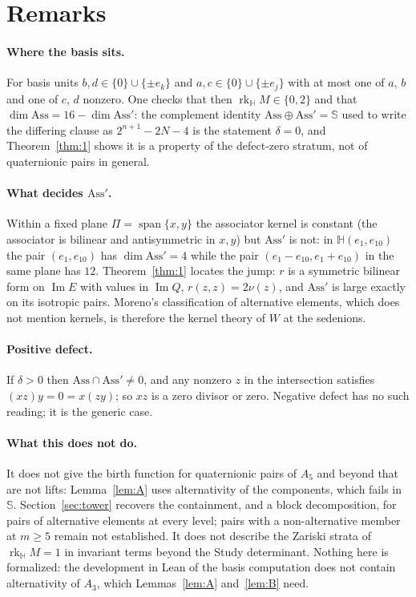 \documentclass{baustms}
\theoremstyle{cupthm}
\numberwithin{equation}{section}
\newcommand{\Ass}{\mathrm{Ass}}
\newcommand{\HH}{\mathbb{H}}
\newcommand{\Sed}{\mathbb{S}}
\newcommand{\Imm}{\operatorname{Im}}
\newcommand{\rk}{\operatorname{rk}}
\begin{document}
\section{Remarks}

\paragraph{Where the basis sits.}
For basis units $b,d\in\{0\}\cup\{\pm e_k\}$ and $a,c\in\{0\}\cup\{\pm e_j\}$ with at most one of $a$, $b$ and one of $c$, $d$ nonzero. One checks that then $\rk_{\HH} M\in\{0,2\}$ and that $\dim\Ass=16-\dim\Ass'$: the complement identity $\Ass\oplus\Ass'=\Sed$ used to write the differing clause as $2^{n+1}-2N-4$ is the statement $\delta=0$, and Theorem~\ref{thm:1} shows it is a property of the defect-zero stratum, not of quaternionic pairs in general.

\paragraph{What decides $\Ass'$.}
Within a fixed plane $\Pi=\operatorname{span}\{x,y\}$ the associator kernel is constant (the associator is bilinear and antisymmetric in $x,y$) but $\Ass'$ is not: in $\HH(e_1,e_{10})$ the pair $(e_1,e_{10})$ has $\dim\Ass'=4$ while the pair $(e_1-e_{10},e_1+e_{10})$ in the same plane has $12$. Theorem~\ref{thm:1} locates the jump: $r$ is a symmetric bilinear form on $\Imm E$ with values in $\Imm Q$, $r(z,z)=2\nu(z)$, and $\Ass'$ is large exactly on its isotropic pairs. Moreno's classification of alternative elements, which does not mention kernels, is therefore the kernel theory of $W$ at the sedenions.

\paragraph{Positive defect.}
If $\delta>0$ then $\Ass\cap\Ass'\neq 0$, and any nonzero $z$ in the intersection satisfies $(xz)y=0=x(zy)$; so $xz$ is a zero divisor or zero. Negative defect has no such reading; it is the generic case.

\paragraph{What this does not do.}
It does not give the birth function for quaternionic pairs of $A_5$ and beyond that are not lifts: Lemma~\ref{lem:A} uses alternativity of the components, which fails in $\Sed$. Section~\ref{sec:tower} recovers the containment, and a block decomposition, for pairs of alternative elements at every level; pairs with a non-alternative member at $m\ge 5$ remain not established. It does not describe the Zariski strata of $\rk_{\HH} M=1$ in invariant terms beyond the Study determinant. Nothing here is formalized: the development in Lean of the basis computation does not contain alternativity of $A_3$, which Lemmas~\ref{lem:A} and~\ref{lem:B} need.
\end{document}
